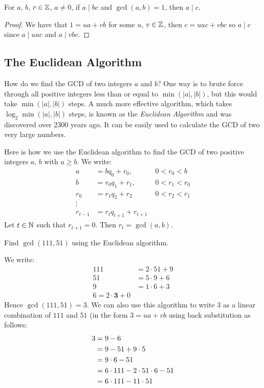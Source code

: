 \begin{corrbox}
   For $a$, $b$, $c \in \mathbb{Z}$, $a \neq 0$, if $a \mid bc$ and $\gcd(a,b) = 1$, then $a \mid c$.
\end{corrbox}
\begin{proof}
   We have that $1 = ua + vb$ for some $u$, $v \in \mathbb{Z}$, then $c = uac + vbc$ so $a \mid c$ since $a \mid uac$ and $a \mid vbc$.
\end{proof}

\subsection{The Euclidean Algorithm}

How do we find the GCD of two integers $a$ and $b$? One way is to brute force through all positive integers less than or equal to $\min(|a|, |b|)$, but this would take $\min(|a|, |b|)$ steps. A much more effective algorithm, which takes $\log_2 \min(|a|, |b|)$ steps, is known as the \textit{Euclidean Algorithm} and was discovered over 2300 years ago. It can be easily used to calculate the GCD of two very large numbers. 

Here is how we use the Euclidean algorithm to find the GCD of two positive integers $a$, $b$ with $a \geq b$. We write:
\begin{align*}
   a &= bq_0 + r_0, &\; 0 < r_0 < b\\
   b &= r_0q_1 + r_1, &\; 0 < r_1 < r_0 \\
   r_0&= r_1q_2 + r_2 &\; 0 < r_2 < r_1 \\ 
   \vdots \\ 
   r_{t-1}&= r_tq_{t + 1} + r_{t+1}
\end{align*}
Let $t \in \mathbb{N}$ such that $r_{t + 1} = 0$. Then $r_t = \gcd(a,b)$.

\begin{example}
   Find $\gcd(111,51)$ using the Euclidean algorithm.
\end{example}
\begin{solution}
   We write:
   \begin{align*}
      111 &= 2 \cdot 51 + 9 \\
      51 &= 5 \cdot 9 + 6 \\
      9 &= 1 \cdot 6 + 3 \\
      6 = 2 \cdot \mathbf{3} + 0
   \end{align*}
   Hence $\gcd(111,51) = 3$. We can also use this algorithm to write $3$ as a linear combination of $111$ and $51$ (in the form $3 = ua + vb$ using back substitution as follows:
   \begin{align*}
      3 &= 9 - 6 \\
        &= 9 - 51 + 9 \cdot 5 \\
        &= 9 \cdot 6 - 51 \\
        &= 6 \cdot 111 - 2 \cdot 51 \cdot 6 - 51 \\
        &= 6 \cdot 111 - 11 \cdot 51 \qedhere
   \end{align*}
\end{solution}

